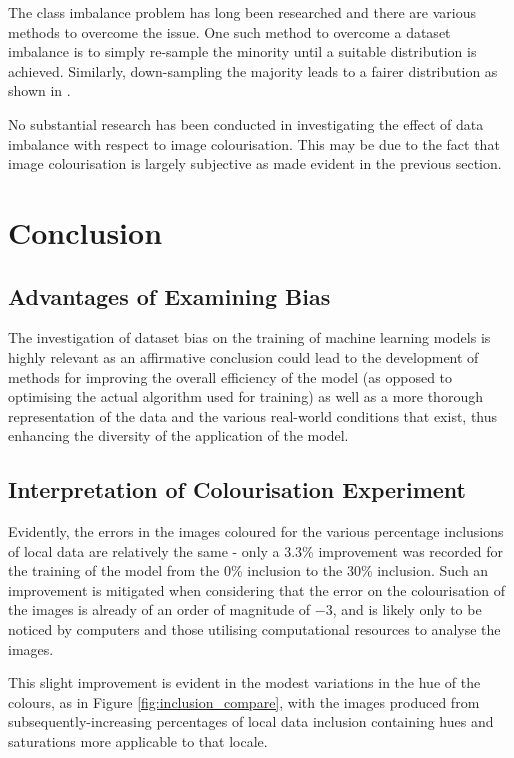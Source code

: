 \documentclass[conference]{IEEEtran}
\begin{document}
The class imbalance problem has long been researched and there are various methods \cite{japkowicz2000class} to overcome the issue. One such method to overcome a dataset imbalance is to simply re-sample the minority until a suitable distribution is achieved. Similarly, down-sampling the majority leads to a fairer distribution as shown in \cite{japkowicz2000class}. 

No substantial research has been conducted in investigating the effect of data imbalance with respect to image colourisation. This may be due to the fact that image colourisation is largely subjective as made evident in the previous section.

\section{Conclusion}

%
%
%
\subsection{Advantages of Examining Bias}

The investigation of dataset bias on the training of machine learning models is highly relevant as an affirmative conclusion could lead to the development of methods for improving the overall efficiency of the model (as opposed to optimising the actual algorithm used for training) as well as a more thorough representation of the data and the various real-world conditions that exist, thus enhancing the diversity of the application of the model.

\subsection{Interpretation of Colourisation Experiment}

Evidently, the errors in the images coloured for the various percentage inclusions of local data are relatively the same - only a 3.3\% improvement was recorded for the training of the model from the 0\% inclusion to the 30\% inclusion. Such an improvement is mitigated when considering that the error on the colourisation of the images is already of an order of magnitude of $-3$, and is likely only to be noticed by computers and those utilising computational resources to analyse the images.

This slight improvement is evident in the modest variations in the hue of the colours, as in Figure \ref{fig:inclusion_compare}, with the images produced from subsequently-increasing percentages of local data inclusion containing hues and saturations more applicable to that locale.
\end{document}
